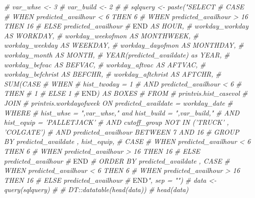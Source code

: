 \documentclass[]{article}
\newenvironment{Shaded}{\begin{snugshade}}{\end{snugshade}}
\newcommand{\CommentTok}[1]{\textcolor[rgb]{0.56,0.35,0.01}{\textit{#1}}}
\newcommand{\RegionMarkerTok}[1]{#1}
\begin{document}
\begin{Shaded}
\begin{Highlighting}[]
\CommentTok{# var_whse <- 3}
\CommentTok{# var_build <- 2}
\CommentTok{# }
\CommentTok{# sqlquery <- paste("SELECT }
\CommentTok{#                   CASE}
\CommentTok{#                   WHEN predicted_availhour < 6 THEN 6}
\CommentTok{#                   WHEN predicted_availhour > 16 THEN 16}
\CommentTok{#                   ELSE predicted_availhour}
\CommentTok{#                   }\RegionMarkerTok{END}\CommentTok{ AS HOUR,}
\CommentTok{#                   workday_workday AS WORKDAY,}
\CommentTok{#                   workday_weekofmon AS MONTHWEEK,}
\CommentTok{#                   workday_weekday AS WEEKDAY,}
\CommentTok{#                   workday_dayofmon AS MONTHDAY,}
\CommentTok{#                   workday_month AS MONTH,}
\CommentTok{#                   YEAR(predicted_availdate) as YEAR,}
\CommentTok{#                   workday_befvac AS BEFVAC,}
\CommentTok{#                   workday_aftvac AS AFTVAC,}
\CommentTok{#                   workday_befchrist AS BEFCHR,}
\CommentTok{#                   workday_aftchrist AS AFTCHR,}
\CommentTok{#                   SUM(CASE}
\CommentTok{#                   WHEN}
\CommentTok{#                   hist_twoday = 1}
\CommentTok{#                   AND predicted_availhour < 6}
\CommentTok{#                   THEN}
\CommentTok{#                   1}
\CommentTok{#                   ELSE 1}
\CommentTok{#                   }\RegionMarkerTok{END}\CommentTok{) AS BOXES}
\CommentTok{#                   FROM}
\CommentTok{#                   printvis.hist_casevol}
\CommentTok{#                   JOIN}
\CommentTok{#                   printvis.workdayofweek ON predicted_availdate = workday_date}
\CommentTok{#                   WHERE }
\CommentTok{#                   hist_whse = ",var_whse," and hist_build = ",var_build," }
\CommentTok{#                   AND hist_equip = 'PALLETJACK'}
\CommentTok{#                   AND cutoff_group NOT IN ('TRUCK' , 'COLGATE')}
\CommentTok{#                   AND predicted_availhour BETWEEN 7 AND 16}
\CommentTok{#                   GROUP BY predicted_availdate , hist_equip, }
\CommentTok{#                   CASE}
\CommentTok{#                   WHEN predicted_availhour < 6 THEN 6}
\CommentTok{#                   WHEN predicted_availhour > 16 THEN 16}
\CommentTok{#                   ELSE predicted_availhour}
\CommentTok{#                   }\RegionMarkerTok{END}
\CommentTok{#                   ORDER BY predicted_availdate , CASE}
\CommentTok{#                   WHEN predicted_availhour < 6 THEN 6}
\CommentTok{#                   WHEN predicted_availhour > 16 THEN 16}
\CommentTok{#                   ELSE predicted_availhour}
\CommentTok{#                   }\RegionMarkerTok{END}\CommentTok{", sep = "")}
\CommentTok{# data <- query(sqlquery)}
\CommentTok{# }
\CommentTok{# DT::datatable(head(data))}
\CommentTok{# head(data)}
\end{Highlighting}
\end{Shaded}
\end{document}
